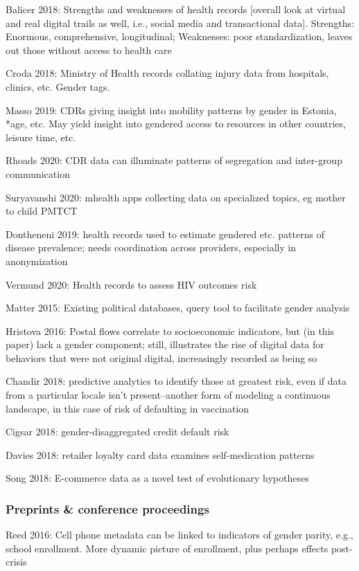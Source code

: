 \documentclass{article}
\begin{document}
Balicer 2018: Strengths and weaknesses of health records [overall look at virtual and real digital trails as well, i.e., social media and transactional data]. Strengths: Enormous, comprehensive, longitudinal; Weaknesses: poor standardization, leaves out those without access to health care

Croda 2018: Ministry of Health records collating injury data from hospitals, clinics, etc. Gender tags.

Masso 2019: CDRs giving insight into mobility patterns by gender in Estonia, *age, etc. May yield insight into gendered access to resources in other countries, leisure time, etc.

Rhoads 2020: CDR data can illuminate patterns of segregation and inter-group communication

Suryavanshi 2020: mhealth apps collecting data on specialized topics, eg mother to child PMTCT

Dontheneni 2019: health records used to estimate gendered etc. patterns of disease prevalence; needs coordination across providers, especially in anonymization

Vermund 2020: Health records to assess HIV outcomes risk

Matter 2015: Existing political databases, query tool to facilitate gender analysis

Hristova 2016: Postal flows correlate to socioeconomic indicators, but (in this paper) lack a gender component; still, illustrates the rise of digital data for behaviors that were not original digital, increasingly recorded as being so

Chandir 2018: predictive analytics to identify those at greatest risk, even if data from a particular locale isn't present--another form of modeling a continuous landscape, in this case of risk of defaulting in vaccination

Cigsar 2018: gender-disaggregated credit default risk

Davies 2018: retailer loyalty card data examines self-medication patterns

Song 2018: E-commerce data as a novel test of evolutionary hypotheses

\subsubsection{Preprints \& conference proceedings}

Reed 2016: Cell phone metadata can be linked to indicators of gender parity, e.g., school enrollment. More dynamic picture of enrollment, plus perhaps effects post-crisis
\end{document}

